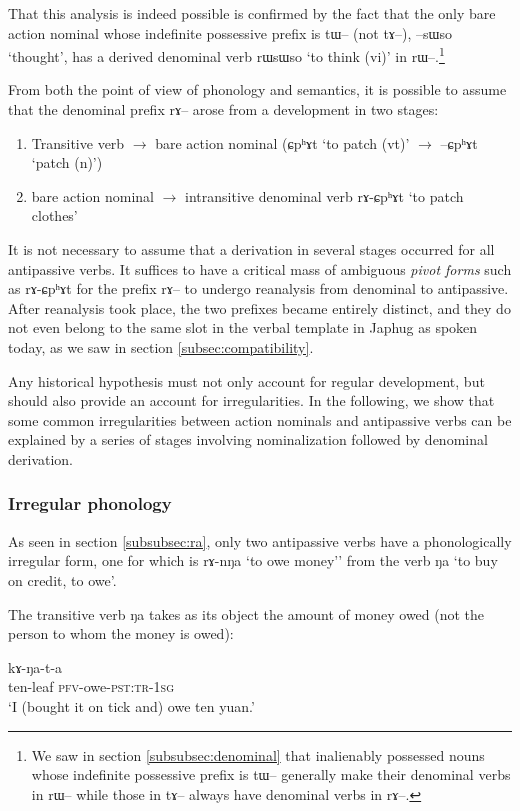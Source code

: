 \documentclass[oldfontcommands,oneside,a4paper,11pt]{article}
\newcommand{\ipa}[1]{{\phon \mbox{#1}}} %
\begin{document}
That this analysis is indeed possible is confirmed by the fact that the only bare action nominal whose indefinite possessive prefix is  \ipa{tɯ--} (not \ipa{tɤ--}), \ipa{--sɯso} `thought', has a derived denominal verb \ipa{rɯsɯso} `to think (vi)' in \ipa{rɯ}--.\footnote{We saw in section \ref{subsubsec:denominal} that inalienably possessed nouns whose indefinite possessive prefix is \ipa{tɯ}-- generally make their denominal verbs in \ipa{rɯ}-- while those in \ipa{tɤ}-- always have denominal verbs in \ipa{rɤ}--.}

From both the point of view of phonology and semantics, it is possible to assume that the denominal prefix \ipa{rɤ}-- arose from a development in two stages:
\begin{enumerate}
\item Transitive verb $\rightarrow$ bare action nominal (\ipa{ɕpʰɤt} `to patch (vt)' $\rightarrow$ \ipa{--ɕpʰɤt} `patch (n)')
\item bare action nominal $\rightarrow$ intransitive denominal verb \ipa{rɤ-ɕpʰɤt} `to patch clothes'
\end{enumerate}

It is not necessary to assume that a derivation in several stages occurred for all antipassive verbs. It suffices to have a critical mass of ambiguous \textit{pivot forms} such as \ipa{rɤ-ɕpʰɤt} for the prefix \ipa{rɤ}-- to undergo reanalysis from denominal to antipassive.   After reanalysis took place, the two prefixes became entirely distinct, and they do not  even belong to the same slot in the verbal template in   Japhug as spoken today, as we saw in section \ref{subsec:compatibility}.

 Any historical hypothesis must not only account for regular development, but should also provide an account for irregularities. In the following, we show that  some common irregularities between action nominals and antipassive verbs can be explained by a series of stages involving nominalization followed by denominal derivation.


\subsubsection{Irregular phonology} \label{subsec:phono.irr}
As seen in section \ref{subsubsec:ra}, only two antipassive verbs have a phonologically irregular form, one for which is \ipa{rɤ-nŋa} `to owe money'' from the verb \ipa{ŋa} `to buy on credit, to owe'.


The transitive verb  \ipa{ŋa} takes as its object the amount of money owed (not the person to whom the money is owed):
   \begin{exe} \label{ex:kaNata}
\ex
\gll    \ipa{sqɯ-mpɕar } \ipa{kɤ-ŋa-t-a} \\
 ten-leaf \textsc{pfv}-owe-\textsc{pst:tr-1sg} \\
 \glt  `I (bought it on tick and) owe  ten yuan.'
\end{exe} 
\end{document}
